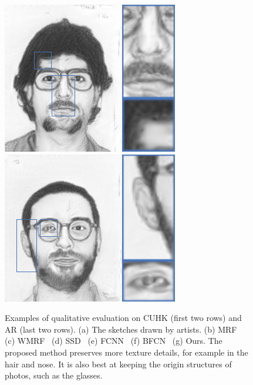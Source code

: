 \documentclass[10pt,twocolumn,letterpaper]{article}
\begin{document}
\begin{figure}[htbp]
{\begin{minipage}[b]{0.13\linewidth}
\includegraphics[width=0.99\linewidth]{img/sketch_result/ours_s3.png}
\includegraphics[width=0.99\linewidth]{img/sketch_result/ours_s4.png}
\end{minipage}
}
\caption{Examples of qualitative evaluation on CUHK (first two rows) and AR (last two rows). (a) The sketches drawn by artists. (b) MRF~\cite{wang2009face} (c) WMRF~\cite{zhou2012markov} (d) SSD~\cite{song2014real} (e) FCNN~\cite{zhang2015end} (f) BFCN~\cite{zhang2017content} (g) Ours. The proposed method preserves more texture details, for example in the hair and nose. It is also best at keeping the origin structures of photos, such as the glasses.}
\label{fig:qua_eval}
\end{figure}
\end{document}

